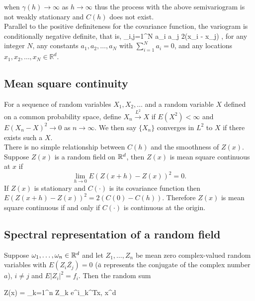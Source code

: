 
when $\gamma(h) \to \infty$ as $h \to \infty$ thus the process with the above semivariogram is not weakly stationary and $C(h)$ does not exist. \\

Parallel to the positive definiteness for the covariance function, the variogram is conditionally negative definite, that is,
\beq
\sum_{i,j=1}^{N} a_i a_j 2\gamma(x_i - x_j) ,
\eeq
for any integer $N$, any constants $a_1, a_2, \ldots, a_N$ with $\sum_{i=1}^N a_i = 0$, and any locations $x_1, x_2, \ldots, x_N \in \mathbb{R}^d$.


\subsection{\bf Mean square continuity}

For a sequence of random variables $X_1, X_2,\ldots$ and a random variable $X$ defined on a common probability space, define $X_n\overset{L^2}\to X$ if $E(X^2)<\infty$ and $E(X_n - X)^2\to 0$ as $n \rightarrow \infty$. We then say $\{X_n\}$ converges in $L^2$ to $X$ if there exists such a $X$.\\

There is no simple relationship between $C(h)$ and the smoothness of $Z(x)$. Suppose $Z(x)$ is a random field on $\mathbb{R}^d$, then $Z(x)$ is mean square continuous at $x$ if
\[
\lim_{h\to 0} E(Z(x+h)-Z(x))^2 =0.
\]
If $Z(x)$ is stationary and $C(\cdot)$ is its covariance function then $E(Z(x+h)-Z(x))^2=2(C(0)-C(h))$. Therefore $Z(x)$ is mean square continuous if and only if $C(\cdot)$ is continuous at the origin.

\subsection{\bf Spectral representation of a random field}

Suppose $\omega_1,\ldots, \omega_n \in \mathbb{R}^d$ and let $Z_1, \ldots, Z_n$ be mean zero complex-valued random variables with  $E(Z_i\bar{Z_j})=0$  ($\bar{a}$ represents the conjugate of the complex number $a$), $i\ne j$ and  $E|Z_i|^2=f_i$. Then the random sum

\beq 
Z(x) = \sum_{k=1}^n Z_k e^{i\omega_k^Tx}, \quad x\in\R^d
\eeq

